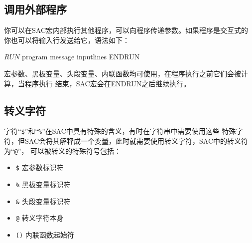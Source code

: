 \subsection{调用外部程序}
你可以在SAC宏内部执行其他程序，可以向程序传递参数。如果程序是交互式的
你也可以将输入行发送给它，语法如下：
\begin{SACCode}
$RUN$ program message
inputlines
ENDRUN
\end{SACCode}
宏参数、黑板变量、头段变量、内联函数均可使用，在程序执行之前它们会被计算，当程序执行
结束，SAC宏会在ENDRUN之后继续执行。

\subsection{转义字符}
字符``\verb|$|''和``\verb|%|''在SAC中具有特殊的含义，有时在字符串中需要使用这些
特殊字符，但SAC会将其解释成一个变量，此时就需要使用转义字符，SAC中的转义符为``\verb|@|''，
可以被转义的特殊符号包括：
\begin{itemize}
\item \verb|$| 宏参数标识符
\item \verb|%| 黑板变量标识符
\item \verb|&| 头段变量标识符
\item \verb|@| 转义字符本身
\item \verb|()| 内联函数起始符
\end{itemize}
